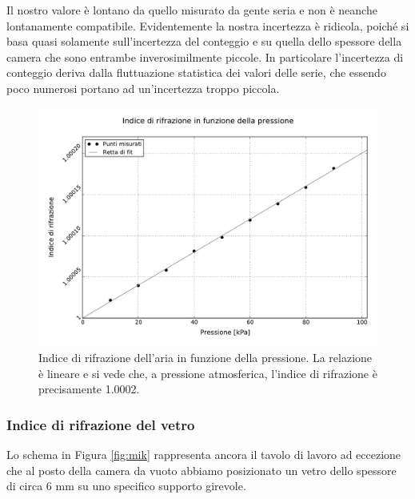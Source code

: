 Il nostro valore è lontano da quello misurato da gente seria e non è neanche lontanamente compatibile. Evidentemente la nostra incertezza
è ridicola, poiché si basa quasi solamente sull'incertezza del conteggio e su quella dello spessore della camera che sono entrambe inverosimilmente piccole. In particolare l'incertezza di conteggio deriva dalla fluttuazione statistica dei valori delle serie, che essendo poco numerosi portano ad un'incertezza troppo piccola.


\begin{figure}[t]
    \centering
        \includegraphics[width=\textwidth]{graph.pdf}
        \caption{Indice di rifrazione dell'aria in funzione della pressione. La relazione è lineare e si vede che, a pressione
			atmosferica, l'indice di rifrazione è precisamente 1.0002.}
        \label{fig:enne_press}
\end{figure}

\subsubsection{Indice di rifrazione del vetro}


Lo schema in Figura \ref{fig:mik} rappresenta ancora il tavolo di lavoro ad eccezione che al posto della camera da vuoto abbiamo posizionato un vetro dello spessore di circa 6 \si{\milli\metre} su uno specifico supporto girevole.

